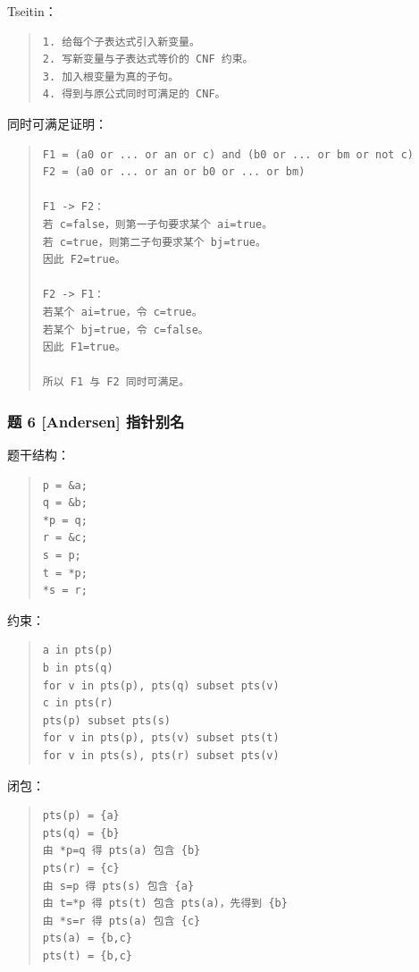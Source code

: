 \documentclass[UTF8,zihao=-4]{ctexart}
\begin{document}
Tseitin：


\begin{quote}
\footnotesize
\begin{verbatim}
1. 给每个子表达式引入新变量。
2. 写新变量与子表达式等价的 CNF 约束。
3. 加入根变量为真的子句。
4. 得到与原公式同时可满足的 CNF。
\end{verbatim}
\end{quote}


同时可满足证明：


\begin{quote}
\footnotesize
\begin{verbatim}
F1 = (a0 or ... or an or c) and (b0 or ... or bm or not c)
F2 = (a0 or ... or an or b0 or ... or bm)

F1 -> F2：
若 c=false，则第一子句要求某个 ai=true。
若 c=true，则第二子句要求某个 bj=true。
因此 F2=true。

F2 -> F1：
若某个 ai=true，令 c=true。
若某个 bj=true，令 c=false。
因此 F1=true。

所以 F1 与 F2 同时可满足。
\end{verbatim}
\end{quote}


\subsubsection{题 6 [Andersen] 指针别名}


题干结构：


\begin{quote}
\footnotesize
\begin{verbatim}
p = &a;
q = &b;
*p = q;
r = &c;
s = p;
t = *p;
*s = r;
\end{verbatim}
\end{quote}


约束：


\begin{quote}
\footnotesize
\begin{verbatim}
a in pts(p)
b in pts(q)
for v in pts(p), pts(q) subset pts(v)
c in pts(r)
pts(p) subset pts(s)
for v in pts(p), pts(v) subset pts(t)
for v in pts(s), pts(r) subset pts(v)
\end{verbatim}
\end{quote}


闭包：


\begin{quote}
\footnotesize
\begin{verbatim}
pts(p) = {a}
pts(q) = {b}
由 *p=q 得 pts(a) 包含 {b}
pts(r) = {c}
由 s=p 得 pts(s) 包含 {a}
由 t=*p 得 pts(t) 包含 pts(a)，先得到 {b}
由 *s=r 得 pts(a) 包含 {c}
pts(a) = {b,c}
pts(t) = {b,c}
\end{verbatim}
\end{quote}
\end{document}
